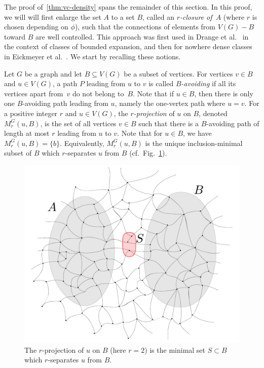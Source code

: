 \medskip
The proof of~\cref{thm:vc-density} spans the remainder of this section.
In this proof, we will
will first enlarge the set $A$ to a set $B$, called
an \emph{$r$-closure of~$A$} (where $r$ is chosen depending on $\phi$), such 
that the connections of elements from $V(G)-B$ 
toward $B$ are well controlled. This approach
was first used in Drange et al.~\cite{drange2016kernelization} in the context of classes of bounded expansion, 
and then for nowhere dense classes in Eickmeyer et al.~\cite{eickmeyer2016neighborhood}. 
We start by recalling these notions.

Let $G$ be a graph and let $B\subseteq V(G)$ be a subset of vertices. For vertices $v\in B$ and $u\in V(G)$, a path $P$ leading from $u$ to $v$ is called {\em{$B$-avoiding}}
if all its vertices apart from~$v$ do not belong to~$B$. Note that if $u\in B$, then there is only one $B$-avoiding path leading from $u$, namely the one-vertex path where $u=v$.
For a positive integer $r$ and $u\in V(G)$, the {\em{$r$-projection}} of $u$ on $B$, denoted $M^G_r(u,B)$, is the set of all vertices $v\in B$ such that there is
a $B$-avoiding path of length at most $r$ leading from $u$ to $v$. Note that for $u\in B$, we have $M^G_r(u,B)=\{b\}$.
Equivalently, $M^G_r(u,B)$ is the unique inclusion-minimal
subset of $B$ which $r$-separates $u$ from $B$ (cf.~Fig.~\ref{fig:projection}).

\begin{figure}[h!]
	\centering
		\includegraphics[scale=0.35,page=2]{pics}
	\caption{The  $r$-projection of $u$ on $B$
	(here $r=2$)
	is the minimal set  $S\subset B$
	which $r$-separates $ u$ from $B$.
	}
	\label{fig:projection}
\end{figure}

